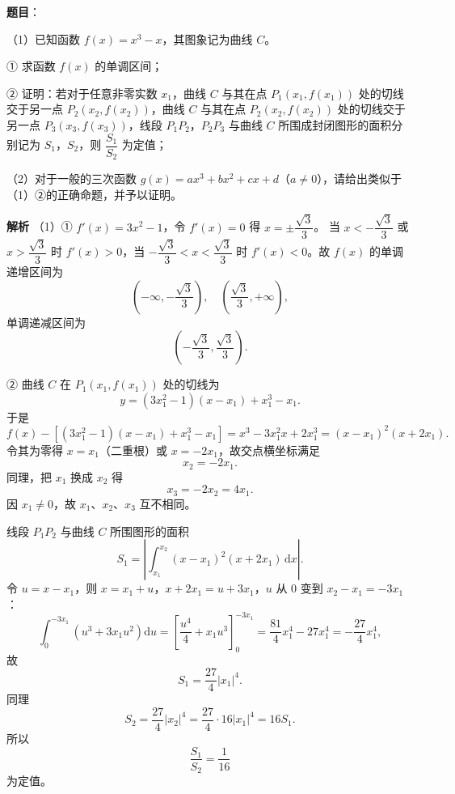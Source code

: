 \begin{answer}

\textbf{题目}：

（1）已知函数 $f(x)=x^3-x$，其图象记为曲线 $C$。

① 求函数 $f(x)$ 的单调区间；

② 证明：若对于任意非零实数 $x_1$，曲线 $C$ 与其在点 $P_1(x_1,f(x_1))$ 处的切线交于另一点 $P_2(x_2,f(x_2))$，曲线 $C$ 与其在点 $P_2(x_2,f(x_2))$ 处的切线交于另一点 $P_3(x_3,f(x_3))$，线段 $P_1P_2$，$P_2P_3$ 与曲线 $C$ 所围成封闭图形的面积分别记为 $S_1$，$S_2$，则 $\dfrac{S_1}{S_2}$ 为定值；

（2）对于一般的三次函数 $g(x)=ax^3+bx^2+cx+d$（$a\neq0$），请给出类似于（1）②的正确命题，并予以证明。

\textbf{解析}
（1）① $f'(x)=3x^2-1$，令 $f'(x)=0$ 得 $x=\pm\dfrac{\sqrt3}{3}$。
当 $x<-\dfrac{\sqrt3}{3}$ 或 $x>\dfrac{\sqrt3}{3}$ 时 $f'(x)>0$，当 $-\dfrac{\sqrt3}{3}<x<\dfrac{\sqrt3}{3}$ 时 $f'(x)<0$。故 $f(x)$ 的单调递增区间为
\nopagebreak[4]
\[\left(-\infty,-\frac{\sqrt3}{3}\right),\quad\left(\frac{\sqrt3}{3},+\infty\right),\]
单调递减区间为
\nopagebreak[4]
\[\left(-\frac{\sqrt3}{3},\frac{\sqrt3}{3}\right).\]

② 曲线 $C$ 在 $P_1(x_1,f(x_1))$ 处的切线为
\nopagebreak[4]
\[y=\left(3x_1^2-1\right)(x-x_1)+x_1^3-x_1.\]
于是
\nopagebreak[4]
\[f(x)-\left[\left(3x_1^2-1\right)(x-x_1)+x_1^3-x_1\right]
=x^3-3x_1^2x+2x_1^3=(x-x_1)^2(x+2x_1).\]
令其为零得 $x=x_1$（二重根）或 $x=-2x_1$，故交点横坐标满足
\nopagebreak[4]
\[x_2=-2x_1.\]
同理，把 $x_1$ 换成 $x_2$ 得
\nopagebreak[4]
\[x_3=-2x_2=4x_1.\]
因 $x_1\neq0$，故 $x_1$、$x_2$、$x_3$ 互不相同。

线段 $P_1P_2$ 与曲线 $C$ 所围图形的面积
\nopagebreak[4]
\[S_1=\left|\int_{x_1}^{x_2}(x-x_1)^2(x+2x_1)\,\mathrm dx\right|.\]
令 $u=x-x_1$，则 $x=x_1+u$，$x+2x_1=u+3x_1$，$u$ 从 $0$ 变到 $x_2-x_1=-3x_1$：
\nopagebreak[4]
\[\int_0^{-3x_1}\left(u^3+3x_1u^2\right)\mathrm du
=\left[\frac{u^4}{4}+x_1u^3\right]_0^{-3x_1}
=\frac{81}{4}x_1^4-27x_1^4=-\frac{27}{4}x_1^4,\]
故
\nopagebreak[4]
\[S_1=\frac{27}{4}\left|x_1\right|^4.\]
同理
\nopagebreak[4]
\[S_2=\frac{27}{4}\left|x_2\right|^4=\frac{27}{4}\cdot16\left|x_1\right|^4=16S_1.\]
所以
\nopagebreak[4]
\[\frac{S_1}{S_2}=\frac1{16}\]
为定值。


\end{answer}
